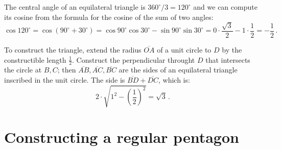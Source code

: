 \documentclass[11pt,a4paper]{article}
\newcommand*{\disfrac}[2]{\displaystyle\frac{#1}{#2}}
\newcommand*{\sm}[1]{$\scriptstyle #1$}
\begin{document}
The central angle of an equilateral triangle is $360^\circ/3=120^\circ$ 
and we can compute its cosine from the formula for the cosine of the sum of two angles:
\[
\cos 120^\circ = \cos(90^\circ+30^\circ)=\cos 90^\circ \cos 30^\circ  -\sin 90^\circ \sin 30^\circ = 0\cdot \frac{\sqrt{3}}{2} - 1\cdot \frac{1}{2}=-\disfrac{1}{2}\,.
\]
\begin{center}
\end{center}
To construct the triangle, extend the radius $\overline{OA}$ of a unit circle to $D$ by the constructible length $\frac{1}{2}$. Construct the perpendicular throught $D$ that intersects the circle at $B,C$; then $\overline{AB},\overline{AC},\overline{BC}$ are the sides of an equilateral triangle inscribed in the unit circle. The side is $\overline{BD}+\overline{DC}$, which is:
\[
2\cdot \sqrt{1^2-\left(\disfrac{1}{2}\right)^2}=\sqrt{3}\,.
\]


\section{Constructing a regular pentagon}\label{a.pentagon}
\end{document}
